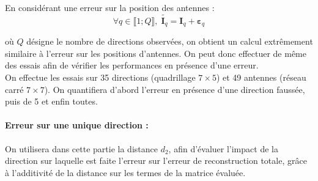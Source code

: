 \documentclass[titlepage]{article}
\begin{document}
	En considérant une erreur sur la position des antennes :
	\begin{equation}
		\forall q\in \llbracket 1;Q\rrbracket,\; \widetilde{\boldsymbol{I}_q} = \boldsymbol{I}_q + \boldsymbol{\varepsilon}_q
	\end{equation}
	
	où $Q$ désigne le nombre de directions observées, on obtient un calcul extrêmement similaire à l'erreur sur les positions d'antennes. On peut donc effectuer de même des essais afin de vérifier les performances en présence d'une erreur. \\
	On effectue les essais sur 35 directions (quadrillage $7\times5$) et 49 antennes (réseau carré $7\times7$). On quantifiera d'abord l'erreur en présence d'une direction faussée, puis de 5 et enfin toutes. \\
	
	\paragraph{Erreur sur une unique direction :} 
	On utilisera dans cette partie la distance $d_2$, afin d'évaluer l'impact de la direction sur laquelle est faite l'erreur sur l'erreur de reconstruction totale, grâce à l'additivité de la distance sur les termes de la matrice évaluée.
	
	
	
\end{document}
